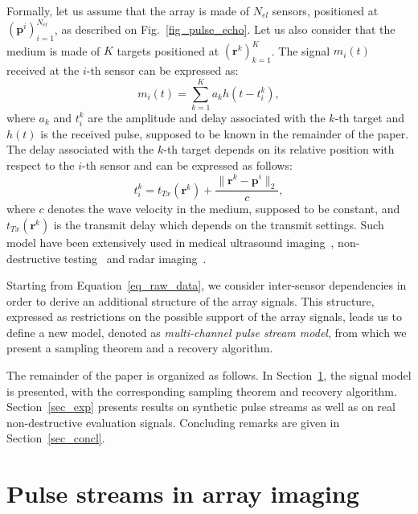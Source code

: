 \documentclass{article}
\newcommand{\vect}[1]{\bm{#1}}
\theoremstyle{definition}
\begin{document}
Formally, let us assume that the array is made of $N_{el}$ sensors, positioned at $\left(\vect{p}^i\right)_{i=1}^{N_{el}}$, as described on Fig.~\ref{fig_pulse_echo}. 
Let us also consider that the medium is made of $K$ targets positioned at $\left(\vect{r}^k\right)_{k=1}^K$. The signal $m_{i} \left(t\right)$ received at the $i$-th sensor can be expressed as:
\begin{equation}
\label{eq_raw_data}
m_{i} \left(t\right) = \sum \limits_{k=1}^{K} a_k h\left(t - t_i^k\right), 
\end{equation}
where $a_k$ and $t_i^k$ are the amplitude and delay associated with the $k$-th target and $h\left(t\right)$ is the received pulse, supposed to be known in the remainder of the paper. 
The delay associated with the $k$-th target depends on its relative position with respect to the $i$-th sensor and can be expressed as follows:
\begin{equation}
\label{eq_usdelay}
t_i^k = t_{Tx}\left(\vect{r}^k\right) + \frac{\|\vect{r}^k -  \vect{p}^i \|_2}{c},
\end{equation}
where $c$ denotes the wave velocity in the medium, supposed to be constant, and $t_{Tx}\left(\vect{r}^k\right)$ is the transmit delay which depends on the transmit settings. Such model have been extensively used in medical ultrasound imaging~\cite{Chernyakova2014, Tur_TSP_2012, Bendory_TSP_2016}, non-destructive testing~\cite{Carcreff_UFFC_2014} and radar imaging~\cite{Ilan_TSP_2014, Baraniuk2007}. 

Starting from Equation~\eqref{eq_raw_data}, we consider inter-sensor dependencies in order to derive an additional structure of the array signals. 
This structure, expressed as restrictions on the possible support of the array signals, leads us to define a new model, denoted as \textit{multi-channel pulse stream model}, from which we present a sampling theorem and a recovery algorithm.

The remainder of the paper is organized as follows. 
In Section~\ref{sec_pulsestreams_US}, the signal model is presented, with the corresponding sampling theorem and recovery algorithm. 
Section~\ref{sec_exp} presents results on synthetic pulse streams as well as on real non-destructive evaluation signals. Concluding remarks are given in Section~\ref{sec_concl}.
\section{Pulse streams in array imaging}
\label{sec_pulsestreams_US}
\end{document}
